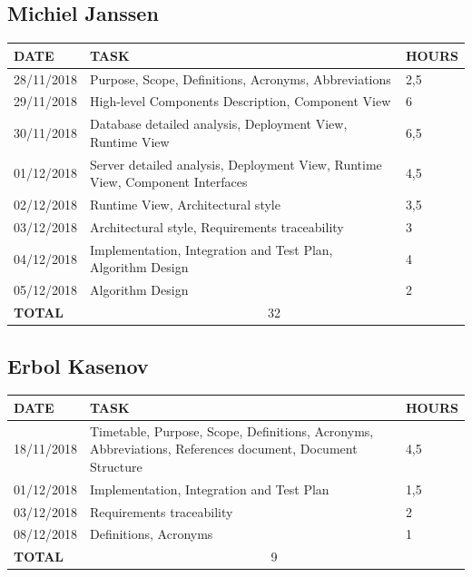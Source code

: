 \documentclass[12pt]{article}
\begin{document}
\subsection{Michiel Janssen}

\begin{center}
\begin{tabular}{ |p{}|p{}|p{}| } 
 \hline
 \textbf{DATE} & \textbf{TASK} & \textbf{HOURS} \\ 
 \hline 
  28/11/2018 & Purpose, Scope, Definitions, Acronyms, Abbreviations & 2,5\\
  \hline
  29/11/2018 & High-level Components Description, Component View & 6\\
  \hline
  30/11/2018 & Database detailed analysis, Deployment View, Runtime View & 6,5\\
  \hline
  01/12/2018 & Server detailed analysis, Deployment View, Runtime View, Component Interfaces & 4,5\\
  \hline
  02/12/2018 & Runtime View, Architectural style & 3,5\\
  \hline
  03/12/2018 & Architectural style, Requirements traceability & 3\\
  \hline
  04/12/2018 & Implementation, Integration and Test Plan, Algorithm Design & 4 \\
  \hline
  05/12/2018 & Algorithm Design & 2\\
  \hline
  \textbf{TOTAL} & \multicolumn{2}{c|}{32} \\ 
  \hline
\end{tabular}
\end{center}


\subsection{Erbol Kasenov}

\begin{center}
\begin{tabular}{ |p{}|p{}|p{}| } 
 \hline
 \textbf{DATE} & \textbf{TASK} & \textbf{HOURS} \\ 
  \hline
  18/11/2018 & Timetable, Purpose, Scope, Definitions, Acronyms, 
  Abbreviations, References document, Document Structure & 4,5\\ 
  \hline
  01/12/2018 & Implementation, Integration and Test Plan & 1,5\\ 
   \hline
  03/12/2018 & Requirements traceability & 2 \\ 
  \hline
  08/12/2018 & Definitions, Acronyms & 1\\
  \hline
  \textbf{TOTAL} & \multicolumn{2}{c|}{9} \\ 
  \hline
\end{tabular}
\end{center}
\end{document}
